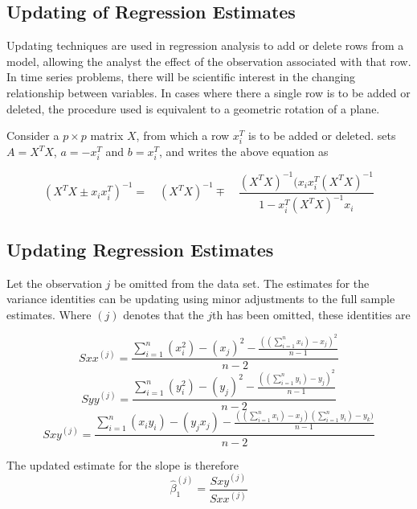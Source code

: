 \documentclass[12pt, a4paper]{article}
\begin{document}
\subsection{Updating of Regression Estimates}
Updating techniques are used in regression analysis to add or
delete rows from a model, allowing the analyst the effect of the
observation associated with that row. In time series problems,
there will be scientific interest in the changing relationship
between variables. In cases where there a single row is to be
added or deleted, the procedure used is equivalent to a geometric
rotation of a plane.

Consider a $p \times p$ matrix $X$, from which a row $x_{i}^{T}$
is to be added or deleted. \citet{CookWeisberg} sets $A = X^{T}X$,
$a=-x_{i}^{T}$ and $b=x_{i}^{T}$, and writes the above equation as

\begin{equation}
(X^{T}X \pm x_{i}x_{i}^{T})^{-1} = \quad(X^{T}X )^{-1} \mp \quad
\frac{(X^{T}X)^{-1}(x_{i}x_{i}^{T}(X^{T}X)^{-1}}{1-x_{i}^{T}(X^{T}X)^{-1}x_{i}}
\end{equation}

\subsection{Updating Regression Estimates}
Let the observation $j$ be omitted from the data set. The estimates for the variance identities can be updating using minor adjustments to the full sample estimates. Where $(j)$ denotes that the $j$th has been omitted, these identities are

\begin{equation}
Sxx^{(j)}=\frac{\sum_{i=1}^{n}(x_{i}^{2})-(x_{j})^{2}-\frac{((\sum_{i=1}^{n}x_{i})-x_{j})^{2}}{n-1}}{n-2}
\end{equation}
\begin{equation}
Syy^{(j)}=\frac{\sum_{i=1}^{n}(y_{i}^{2})-(y_{j})^{2}-\frac{((\sum_{i=1}^{n}y_{i})-y_{j})^{2}}{n-1}}{n-2}
\end{equation}
\begin{equation}
Sxy^{(j)}=\frac{\sum_{i=1}^{n}(x_{i}y_{i})-(y_{j}x_{j})-\frac{((\sum_{i=1}^{n}x_{i})-x_{j})(\sum_{i=1}^{n}y_{i})-y_{k})}{n-1}}{n-2}
\end{equation}

The updated estimate for the slope is therefore
\begin{equation}
\hat{\beta}_{1}^{(j)}=\frac{Sxy^{(j)}}{Sxx^{(j)}}
\end{equation}
\end{document}
